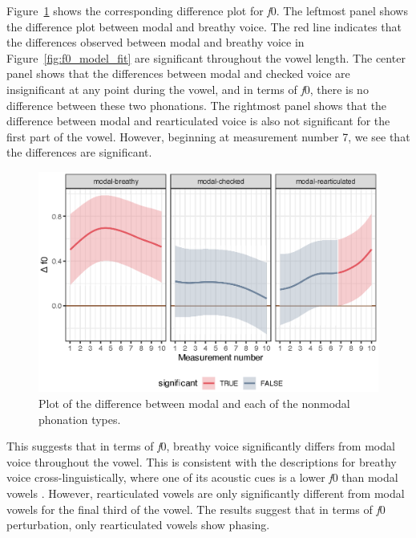 Figure~\ref{fig:f0_model_diff} shows the corresponding difference plot for \textit{f}0. The leftmost panel shows the difference plot between modal and breathy voice. The red line indicates that the differences observed between modal and breathy voice in Figure~\ref{fig:f0_model_fit} are significant throughout the vowel length. The center panel shows that the differences between modal and checked voice are insignificant at any point during the vowel, and in terms of \textit{f}0, there is no difference between these two phonations. The rightmost panel shows that the difference between modal and rearticulated voice is also not significant for the first part of the vowel. However, beginning at measurement number 7, we see that the differences are significant.

\begin{figure}[h!]
    \centering
    \includegraphics[width = \linewidth]{images/LCH_GAMMs/f0_model_diff.eps}
    \caption{Plot of the difference between modal and each of the nonmodal phonation types.}
    \label{fig:f0_model_diff}
\end{figure}

This suggests that in terms of \textit{f}0, breathy voice significantly differs from modal voice throughout the vowel. This is consistent with the descriptions for breathy voice cross-linguistically, where one of its acoustic cues is a lower \textit{f}0 than modal vowels \citep[e.g.,][]{hillenbrandAcousticCorrelatesBreathy1996}. However, rearticulated vowels are only significantly different from modal vowels for the final third of the vowel. The results suggest that in terms of \textit{f}0 perturbation, only rearticulated vowels show phasing. 
